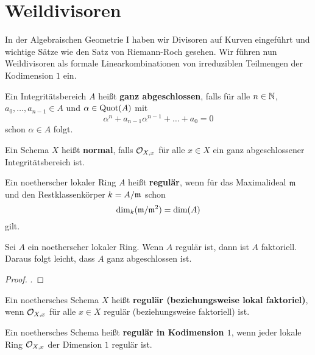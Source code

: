
\chapter{Weildivisoren}

In der Algebraischen Geometrie I haben wir Divisoren auf Kurven eingeführt und wichtige Sätze wie den Satz von Riemann-Roch gesehen. Wir führen nun Weildivisoren als formale Linearkombinationen von irreduziblen Teilmengen der Kodimension $1$ ein.

\begin{eri}
\label{eri:12.1}
	Ein Integritätsbereich $A$ heißt \textbf{ganz abgeschlossen}, falls für alle $n \in \mathbb {N}$, $a_0,\ldots,a_{n-1} \in A$ und $\alpha\in \operatorname{Quot}(A)$ mit
	\[
		\alpha^n+a_{n-1}\alpha^{n-1}+\ldots+a_0 = 0
	\]
	schon $\alpha \in A$ folgt.
\end{eri}

\begin{defn}
\label{defn:12.2}
	Ein Schema $X$ heißt \textbf{normal}, falls $\mathcal{O}_{X,x}$ für alle $x\in X$ ein ganz abgeschlossener Integritätsbereich ist.
\end{defn}

\begin{defn}
\label{defn:12.3}
	Ein noetherscher lokaler Ring $A$ heißt \textbf{regulär}, wenn für das Maximalideal $\mathfrak{m}$ und den Restklassenkörper $k = A/\mathfrak{m}$ schon
	\[
		\dim_k(\mathfrak{m}/\mathfrak{m}^2) = \dim(A)
	\]
	gilt.
\end{defn}

\begin{bem}
\label{bem:12.4}
	Sei $A$ ein noetherscher lokaler Ring. Wenn $A$ regulär ist, dann ist $A$ faktoriell. Daraus folgt leicht, dass $A$ ganz abgeschlossen ist.
	\begin{proof}
		\cite[78]{matsumura1970commutative}.
	\end{proof}
\end{bem}

\begin{defn}
\label{defn:12.5}
	Ein noethersches Schema $X$ heißt \textbf{regulär (beziehungsweise lokal faktoriel)}, wenn $\mathcal{O}_{X,x}$ für alle $x \in X$ regulär (beziehungsweise faktoriell) ist.
\end{defn}

\begin{defn}
\label{defn:12.6}
	Ein noethersches Schema heißt \textbf{regulär in Kodimension $1$}, wenn jeder lokale Ring $\mathcal{O}_{X,x}$ der Dimension $1$ regulär ist.
\end{defn}


